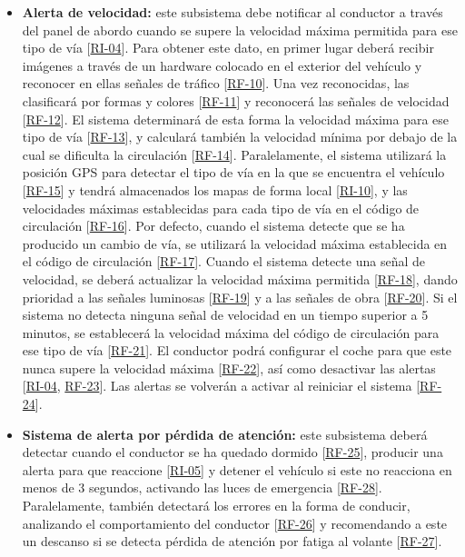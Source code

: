 \begin{itemize}[-]
\item \textbf{Alerta de velocidad:}  este subsistema debe notificar al conductor a través del panel de abordo cuando se supere la velocidad máxima permitida para ese tipo de vía [\hyperref[tab:RI-04]{RI-04}]. Para obtener este dato, en primer lugar deberá recibir imágenes a través de un hardware colocado en el exterior del vehículo y reconocer en ellas señales de tráfico [\hyperref[tab:RF-10]{RF-10}]. Una vez reconocidas, las clasificará por formas y colores [\hyperref[tab:RF-11]{RF-11}] y reconocerá las señales de velocidad [\hyperref[tab:RF-12]{RF-12}]. El sistema determinará de esta forma la velocidad máxima para ese tipo de vía [\hyperref[tab:RF-13]{RF-13}], y calculará también la velocidad mínima por debajo de la cual se dificulta la circulación [\hyperref[tab:RF-14]{RF-14}]. Paralelamente, el sistema utilizará la posición GPS para detectar el tipo de vía en la que se encuentra el vehículo [\hyperref[tab:RF-15]{RF-15}] y tendrá almacenados los mapas de forma local [\hyperref[tab:RI-10]{RI-10}], y las velocidades máximas establecidas para cada tipo de vía en el código de circulación [\hyperref[tab:RF-16]{RF-16}]. Por defecto, cuando el sistema detecte que se ha producido un cambio de vía, se utilizará la velocidad máxima establecida en el código de circulación [\hyperref[tab:RF-17]{RF-17}]. Cuando el sistema detecte una señal de velocidad, se deberá actualizar la velocidad máxima permitida [\hyperref[tab:RF-18]{RF-18}], dando prioridad a las señales luminosas [\hyperref[tab:RF-19]{RF-19}] y a las señales de obra [\hyperref[tab:RF-20]{RF-20}]. Si el sistema no detecta ninguna señal de velocidad en un tiempo superior a 5 minutos, se establecerá la velocidad máxima del código de circulación para ese tipo de vía [\hyperref[tab:RF-21]{RF-21}]. El conductor podrá configurar el coche para que este nunca supere la velocidad máxima [\hyperref[tab:RF-22]{RF-22}], así como desactivar las alertas [\hyperref[tab:RI-04]{RI-04}, \hyperref[tab:RF-23]{RF-23}]. Las alertas se volverán a activar al reiniciar el sistema [\hyperref[tab:RF-24]{RF-24}].
\item \textbf{Sistema de alerta por pérdida de atención:} este subsistema deberá detectar cuando el conductor se ha quedado dormido [\hyperref[tab:RF-25]{RF-25}], producir una alerta para que reaccione [\hyperref[tab:RI-05]{RI-05}] y detener el vehículo si este no reacciona en menos de 3 segundos, activando las luces de emergencia [\hyperref[tab:RF-28]{RF-28}]. Paralelamente, también detectará los errores en la forma de conducir, analizando el comportamiento del conductor [\hyperref[tab:RF-26]{RF-26}] y recomendando a este un descanso si se detecta pérdida de atención por fatiga al volante [\hyperref[tab:RF-27]{RF-27}].

\end{itemize}
